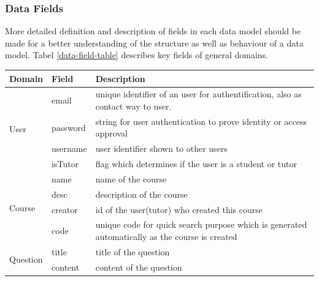 \subsubsection{ Data Fields }

More detailed definition and description of fields in each data model should be made for a better understanding of the structure as well as behaviour of a data model. Tabel \ref{data-field-table} describes key fields of general domains.


\begin{table}[]
\centering
\begin{tabularx}{\textwidth}{@{}llX@{}}
\toprule
Domain                    & Field           & Description                                                                                    \\ \midrule
\multirow{4}{*}{User}     & email           & unique identifier of an user for authentification, also as contact way to user.                \\
                          & password        & string for user authentication to prove identity or access approval                            \\
                          & username        & user identifier shown to other users                                                           \\
                          & isTutor         & flag which determines if the user is a student or tutor                                        \\ \midrule
\multirow{4}{*}{Course}   & name            & name of the course                                                                             \\
                          & desc            & description of the course                                                                      \\
                          & creator         & id of the user(tutor) who created this course                                                  \\
                          & code            & unique code for quick search purpose which is generated automatically as the course is created \\ \midrule
\multirow{5}{*}{Question} & title           & title of the question                                                                          \\
                          & content         & content of the question                                                                        \\

\end{tabularx}
\end{table}
